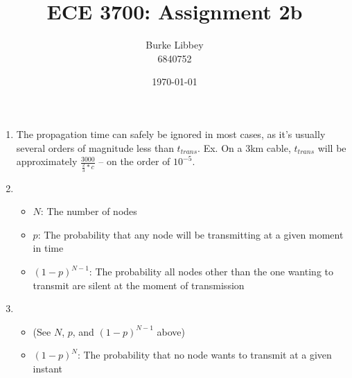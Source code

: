 \documentclass[10pt,letterpaper]{article}
\begin{document}
\author{Burke Libbey \\ 6840752}
\title{ECE 3700: Assignment 2b}
\date{\today}

\maketitle

\begin{enumerate}
\item The propagation time can safely be ignored in most cases, as it's usually several orders of magnitude less than $t_{trans}$. Ex. On a 3km cable, $t_{trans}$ will be approximately $\frac{3000}{\frac{2}{3}*c}$ -- on the order of $10^{-5}$.

\item 
  \begin{itemize}
    \item \textbf{$N$}: The number of nodes
    \item \textbf{$p$}: The probability that any node will be transmitting at a given moment in time
    \item \textbf{$(1-p)^{N-1}$}: The probability all nodes other than the one wanting to transmit are silent at the moment of transmission
  \end{itemize}

\item 
  \begin{itemize}
    \item (See $N$, $p$, and $(1-p)^{N-1}$ above)
    \item \textbf{$(1-p)^{N}$}: The probability that no node wants to transmit at a given instant
  \end{itemize}


\end{enumerate}
\end{document}
